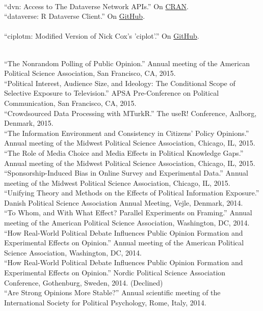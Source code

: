 \documentclass[12pt]{article}
\renewcommand{\section}[1]{\pagebreak[3]%
    \llap{\scshape\smash{\parbox[t]{\marginparwidth}{\raggedright {\color{lg}#1}}}}%
    \vspace{-\baselineskip}\par}
\newcommand{\topic}[1]{\pagebreak[3]\indent {\color{lg}{\footnotesize #1 }}\\}
\newcommand{\entry}[1]{\indent {\color{lg}\guillemotright}\hspace{2pt}#1\vspace{.25em}\\}
\begin{document}
\topic{R packages contributed to the rOpenSci project}
\entry{``dvn: Access to The Dataverse Network APIs.'' On \href{https://cran.r-project.org/package=dvn}{CRAN}.}
\entry{``dataverse: R Dataverse Client.'' On \href{https://github.com/iqss/dataverse-client-r}{GitHub}.}

\topic{Stata Packages}
\entry{``ciplotm: Modified Version of Nick Cox's 'ciplot'.'' On \href{https://github.com/leeper/ciplotm}{GitHub}.}

\section{Conference\\Papers\\and\\Invited\\Presentations}
\topic{Conference Papers}
\entry{``The Nonrandom Polling of Public Opinion.'' Annual meeting of the American Political Science Association, San Francisco, CA, 2015.}
\entry{``Political Interest, Audience Size, and Ideology: The Conditional Scope of Selective Exposure to Television.'' APSA Pre-Conference on Political Communication, San Francisco, CA, 2015.}
\entry{``Crowdsourced Data Processing with MTurkR.'' The useR! Conference, Aalborg, Denmark, 2015.}
\entry{``The Information Environment and Consistency in Citizens' Policy Opinions.'' Annual meeting of the Midwest Political Science Association, Chicago, IL, 2015.}
\entry{``The Role of Media Choice and Media Effects in Political Knowledge Gaps.'' Annual meeting of the Midwest Political Science Association, Chicago, IL, 2015.}
\entry{``Sponsorship-Induced Bias in Online Survey and Experimental Data.'' Annual meeting of the Midwest Political Science Association, Chicago, IL, 2015.}
\entry{``Unifying Theory and Methods on the Effects of Political Information Exposure.'' Danish Political Science Association Annual Meeting, Vejle, Denmark, 2014.}
\entry{``To Whom, and With What Effect? Parallel Experiments on Framing.'' Annual meeting of the American Political Science Association, Washington, DC, 2014.}
\entry{``How Real-World Political Debate Influences Public Opinion Formation and Experimental Effects on Opinion.'' Annual meeting of the American Political Science Association, Washington, DC, 2014.}
\entry{``How Real-World Political Debate Influences Public Opinion Formation and Experimental Effects on Opinion.'' Nordic Political Science Association Conference, Gothenburg, Sweden, 2014. (Declined)}
\entry{``Are Strong Opinions More Stable?'' Annual scientific meeting of the International Society for Political Psychology, Rome, Italy, 2014.}
\end{document}
